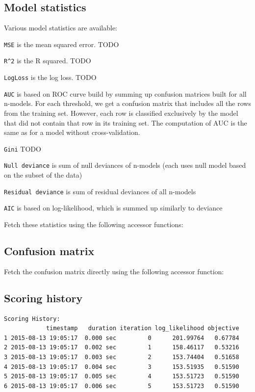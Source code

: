 \subsection{Model statistics}

Various model statistics are available:

\texttt{MSE} is the mean squared error.  TODO

\texttt{R\textasciicircum2} is the R squared.  TODO

\texttt{LogLoss} is the log loss.  TODO

\texttt{AUC} is based on ROC curve build  by summing up confusion matrices built for all n-models.
For each threshold, we get a confusion matrix that includes all the rows from the training set. However, each row
is classified exclusively by the model that did not contain that row in its training set. The computation of AUC is
the same as for a model without cross-validation.

\texttt{Gini}  TODO

\texttt{Null deviance} is sum of null deviances of n-models (each uses null model based on the subset of the data)

\texttt{Residual deviance} is sum of residual deviances of all n-models

\texttt{AIC} is based on log-likelihood, which is summed up similarly to deviance

Fetch these statistics using the following accessor functions:



\subsection{Confusion matrix}

Fetch the confusion matrix directly using the following accessor function:



\subsection{Scoring history}


\begin{lstlisting}[style=output]
Scoring History:
            timestamp   duration iteration log_likelihood objective
1 2015-08-13 19:05:17  0.000 sec         0      201.99764   0.67784
2 2015-08-13 19:05:17  0.002 sec         1      158.46117   0.53216
3 2015-08-13 19:05:17  0.003 sec         2      153.74404   0.51658
4 2015-08-13 19:05:17  0.004 sec         3      153.51935   0.51590
5 2015-08-13 19:05:17  0.005 sec         4      153.51723   0.51590
6 2015-08-13 19:05:17  0.006 sec         5      153.51723   0.51590
\end{lstlisting}

